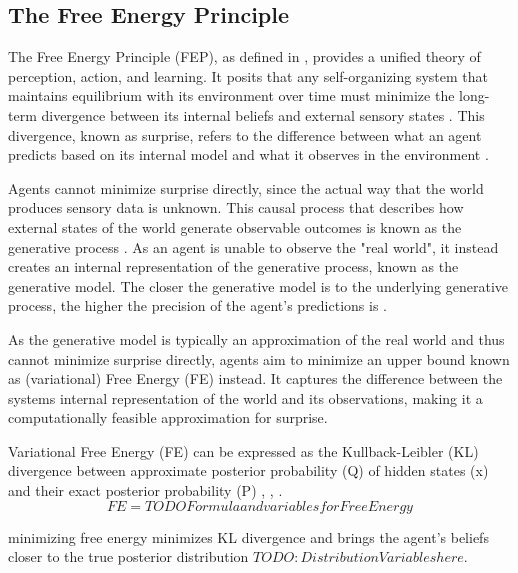 \subsection{The Free Energy Principle}
The Free Energy Principle (FEP), as defined in \cite{friston_free-energy_2010}, provides a unified
theory of perception, action, and learning. It posits that any self-organizing system that
maintains equilibrium with its environment over time must minimize the long-term divergence between its
internal beliefs and external sensory states \cite{friston_active_2017}. This divergence, known as
surprise, refers to the difference between what an agent predicts based on its internal model and what it observes in the environment \cite{sedlak_adaptive_2024}.

Agents cannot minimize surprise directly, since the actual way that the world produces sensory data
is unknown. This causal process that describes how external states of the world generate observable
outcomes is known as the generative process \cite{friston_free-energy_2010}. As an agent is unable to observe the "real world", it instead creates an internal representation of the generative process, known as the generative model. The closer the generative model is to the underlying generative process, the higher the precision of the agent's predictions is \cite{sedlak_active_2024}.

As the generative model is typically an approximation of the real world and thus cannot minimize surprise directly, agents aim to minimize an upper bound known as (variational) Free Energy (FE) instead. It captures the difference between the systems internal representation of the world and its observations, making it a computationally feasible approximation for surprise.

Variational Free Energy (FE) can be expressed as the Kullback-Leibler (KL) divergence between approximate posterior probability (Q) of hidden states (x) and their exact posterior probability (P) \cite{sedlak_active_2024}, \cite{sedlak_adaptive_2024}, \cite{sajid_active_2021}. 
\[FE = TODO Formula and variables for Free Energy\]

 minimizing free energy minimizes KL divergence and brings the agent’s beliefs closer to the true posterior distribution \(TODO: Distribution Variables here\).

